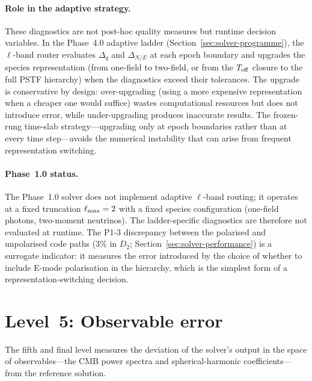 \paragraph{Role in the adaptive strategy.}

These diagnostics are not post-hoc quality measures but
runtime decision variables.  In the Phase~4.0 adaptive
ladder (Section~\ref{sec:solver-programme}), the
$\ell$-band router evaluates $\Delta_q$ and
$\Delta_{N/E}$ at each epoch boundary and upgrades the
species representation (from one-field to two-field, or
from the $T_{\mathrm{eff}}$ closure to the full PSTF hierarchy) when
the diagnostics exceed their tolerances.  The upgrade is
conservative by design: over-upgrading (using a more
expensive representation when a cheaper one would suffice)
wastes computational resources but does not introduce
error, while under-upgrading produces inaccurate results.
The frozen-rung time-slab strategy---upgrading only at
epoch boundaries rather than at every time step---avoids
the numerical instability that can arise from frequent
representation switching.


\paragraph{Phase~1.0 status.}

The Phase~1.0 solver does not implement adaptive $\ell$-band
routing; it operates at a fixed truncation
$\ell_{\rm max} = 2$ with a fixed species configuration
(one-field photons, two-moment neutrinos).  The
ladder-specific diagnostics are therefore not evaluated at
runtime.  The P1-3 discrepancy between the polarised and
unpolarised code paths ($3\%$ in $D_2$;
Section~\ref{sec:solver-performance}) is a surrogate
indicator: it measures the error introduced by the choice
of whether to include E-mode polarisation in the hierarchy,
which is the simplest form of a representation-switching
decision.


\section{Level~5: Observable error}
\label{sec:err-observable}

The fifth and final level measures the deviation of the
solver's output in the space of observables---the CMB power
spectra and spherical-harmonic coefficients---from the
reference solution.


